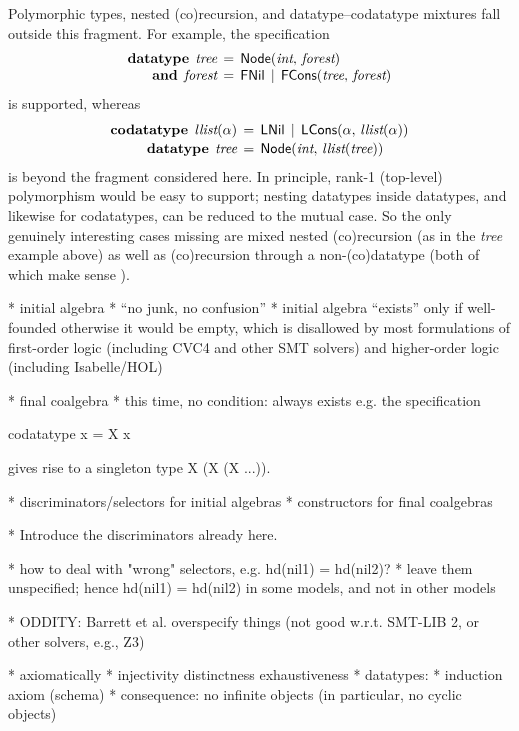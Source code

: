 \documentclass[a4paper,oribibl,envcountsame,draft]{llncs}
\newcommand\keyw[1]{\textbf{#1}}
\newcommand\const[1]{\textsf{#1}}
\newcommand\ty[1]{\textit{#1}}
\begin{document}
Polymorphic types, nested (co)recursion, and datatype--codatatype mixtures fall
outside this fragment. For example, the specification
\[\begin{aligned}[t]
      \keyw{datatype}\;\, \ty{tree} & \,=\, \const{Node}(\ty{int},\, \ty{forest}) \\[-\jot]
      \keyw{and}\;\, \ty{forest} & \,=\, \const{FNil} \,\mid\, \const{FCons}(\ty{tree},\, \ty{forest})
\end{aligned}
\]
is supported, whereas
\[\begin{aligned}[t]
      \keyw{codatatype}\; \,\ty{llist}(\alpha) & \,=\, \const{LNil} \,\mid\, \const{LCons}(\alpha,\, \ty{llist}(\alpha)) \\[-.5\jot]
      \keyw{datatype}\;\, \ty{tree} & \,=\, \const{Node}(\ty{int},\, \ty{llist}(\ty{tree}))
\end{aligned}
\]
is beyond the fragment considered here. In principle, rank-1 (top-level)
polymorphism would be easy to support; nesting datatypes inside datatypes,
and likewise for codatatypes, can be reduced to the mutual case. So the only
genuinely interesting cases missing are mixed nested (co)recursion
(as in the \ty{tree} example above) as well as (co)recursion through a
non-(co)datatype (both of which make sense \cite{blanchette-et-al-2014-codata}).


  * initial algebra
    * ``no junk, no confusion''
    * initial algebra ``exists'' only if well-founded
      otherwise it would be empty, which is disallowed by most formulations of
      first-order logic (including CVC4 and other SMT solvers)
      and higher-order logic (including Isabelle/HOL)

  * final coalgebra
    * this time, no condition: always exists
    e.g. the specification

      codatatype x = X x

    gives rise to a singleton type {X (X (X ...))}.

  * discriminators/selectors for initial algebras
  * constructors for final coalgebras

  * Introduce the discriminators already here.

  * how to deal with "wrong" selectors, e.g.
        hd(nil1) = hd(nil2)?
      * leave them unspecified; hence hd(nil1) = hd(nil2) in some models,
        and not in other models

  * ODDITY: Barrett et al. overspecify things (not good w.r.t. SMT-LIB 2, or
    other solvers, e.g., Z3)

  * axiomatically
    * injectivity
      distinctness
      exhaustiveness
    * datatypes:
      * induction axiom (schema)
        * consequence: no infinite objects (in particular, no cyclic objects)
\end{document}
